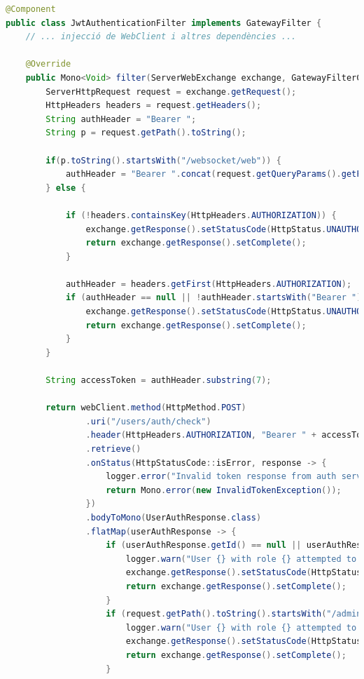 \begin{lstlisting}[language=Java, caption={Implementació del filtre `JwtAuthenticationFilter`}]
@Component
public class JwtAuthenticationFilter implements GatewayFilter {
    // ... injecció de WebClient i altres dependències ...

    @Override
    public Mono<Void> filter(ServerWebExchange exchange, GatewayFilterChain chain) {
        ServerHttpRequest request = exchange.getRequest();
        HttpHeaders headers = request.getHeaders();
        String authHeader = "Bearer ";
        String p = request.getPath().toString();

        if(p.toString().startsWith("/websocket/web")) {
            authHeader = "Bearer ".concat(request.getQueryParams().getFirst("token"));
        } else {

            if (!headers.containsKey(HttpHeaders.AUTHORIZATION)) {
                exchange.getResponse().setStatusCode(HttpStatus.UNAUTHORIZED);
                return exchange.getResponse().setComplete();
            }

            authHeader = headers.getFirst(HttpHeaders.AUTHORIZATION);
            if (authHeader == null || !authHeader.startsWith("Bearer ")) {
                exchange.getResponse().setStatusCode(HttpStatus.UNAUTHORIZED);
                return exchange.getResponse().setComplete();
            }
        }

        String accessToken = authHeader.substring(7); 

        return webClient.method(HttpMethod.POST)
                .uri("/users/auth/check")
                .header(HttpHeaders.AUTHORIZATION, "Bearer " + accessToken) 
                .retrieve()
                .onStatus(HttpStatusCode::isError, response -> {
                    logger.error("Invalid token response from auth service");
                    return Mono.error(new InvalidTokenException());
                })
                .bodyToMono(UserAuthResponse.class)
                .flatMap(userAuthResponse -> {
                    if (userAuthResponse.getId() == null || userAuthResponse.getRole() == null) {
                        logger.warn("User {} with role {} attempted to access admin route {}", userAuthResponse.getUsername(), userAuthResponse.getRole(), request.getPath());
                        exchange.getResponse().setStatusCode(HttpStatus.FORBIDDEN);
                        return exchange.getResponse().setComplete();
                    }
                    if (request.getPath().toString().startsWith("/admin/") && !("ADMIN".equals(userAuthResponse.getRole()) || "SUPER_ADMIN".equals(userAuthResponse.getRole()))) {
                        logger.warn("User {} with role {} attempted to access admin route {}", userAuthResponse.getUsername(), userAuthResponse.getRole(), request.getPath());
                        exchange.getResponse().setStatusCode(HttpStatus.FORBIDDEN);
                        return exchange.getResponse().setComplete();
                    }


\end{lstlisting}
